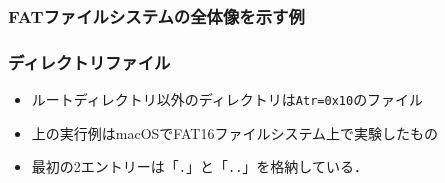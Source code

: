 \documentclass[unicode,handout]{beamer}                   %
\begin{document}
\begin{frame}
  \frametitle{FATファイルシステムの全体像を示す例}
\end{frame}

\begin{frame}
  \frametitle{ディレクトリファイル}
  \begin{itemize}
  \item ルートディレクトリ以外のディレクトリは\texttt{Atr=0x10}のファイル
  \item 上の実行例はmacOSでFAT16ファイルシステム上で実験したもの
  \item 最初の2エントリーは「\texttt{.}」と「\texttt{..}」を格納している．
  \end{itemize}
  \vfill
\end{frame}
\end{document}
